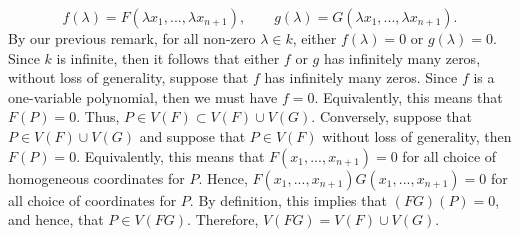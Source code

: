 \begin{solution}
\begin{enumerate}[label = (\arabic*)]
        $$f(\lambda) = F(\lambda x_1, ..., \lambda x_{n+1}), \qquad g(\lambda) = G(\lambda x_1, ..., \lambda x_{n+1}).$$
        By our previous remark, for all non-zero $\lambda \in k$, either $f(\lambda) = 0$ or $g(\lambda) = 0$. Since $k$ is infinite, then it follows that either $f$ or $g$ has infinitely many zeros, without loss of generality, suppose that $f$ has infinitely many zeros. Since $f$ is a one-variable polynomial, then we must have $f = 0$. Equivalently, this means that $F(P) = 0$. Thus, $P \in V(F) \subset V(F) \cup V(G)$. Conversely, suppose that $P \in V(F)\cup V(G)$ and suppose that $P \in V(F)$ without loss of generality, then $F(P) = 0$. Equivalently, this means that $F(x_1, ..., x_{n+1}) = 0$ for all choice of homogeneous coordinates for $P$. Hence, $F(x_1, ..., x_{n+1})G(x_1, ..., x_{n+1}) = 0$ for all choice of coordinates for $P$. By definition, this implies that $(FG)(P) = 0$, and hence, that $P \in V(FG)$. Therefore, $V(FG) = V(F) \cup V(G)$.\\
        

\end{enumerate}
\end{solution}
